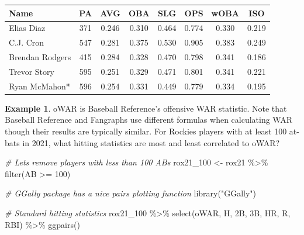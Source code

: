 \documentclass[
  11pt,
]{book}
\newenvironment{Shaded}{\begin{snugshade}}{\end{snugshade}}
\newcommand{\AttributeTok}[1]{\textcolor[rgb]{0.77,0.63,0.00}{#1}}
\newcommand{\CommentTok}[1]{\textcolor[rgb]{0.56,0.35,0.01}{\textit{#1}}}
\newcommand{\DecValTok}[1]{\textcolor[rgb]{0.00,0.00,0.81}{#1}}
\newcommand{\FunctionTok}[1]{\textcolor[rgb]{0.00,0.00,0.00}{#1}}
\newcommand{\NormalTok}[1]{#1}
\newcommand{\OtherTok}[1]{\textcolor[rgb]{0.56,0.35,0.01}{#1}}
\newcommand{\SpecialCharTok}[1]{\textcolor[rgb]{0.00,0.00,0.00}{#1}}
\newcommand{\StringTok}[1]{\textcolor[rgb]{0.31,0.60,0.02}{#1}}
\theoremstyle{definition}
\theoremstyle{definition}
\newtheorem{example}{Example}[chapter]
\theoremstyle{definition}
\theoremstyle{definition}
\theoremstyle{remark}
\begin{document}
\begin{table}[H]
\centering
\begin{tabular}{l|c|c|c|c|c|c|c}
\hline
Name & PA & AVG & OBA & SLG & OPS & wOBA & ISO\\
\hline
Elias Diaz & 371 & 0.246 & 0.310 & 0.464 & 0.774 & 0.330 & 0.219\\
\hline
C.J. Cron & 547 & 0.281 & 0.375 & 0.530 & 0.905 & 0.383 & 0.249\\
\hline
Brendan Rodgers & 415 & 0.284 & 0.328 & 0.470 & 0.798 & 0.341 & 0.186\\
\hline
Trevor Story & 595 & 0.251 & 0.329 & 0.471 & 0.801 & 0.341 & 0.221\\
\hline
Ryan McMahon* & 596 & 0.254 & 0.331 & 0.449 & 0.779 & 0.334 & 0.195\\
\hline
\end{tabular}
\end{table}

\vfill
\newpage

\begin{example}
oWAR is Baseball Reference's offensive WAR statistic. Note that Baseball Reference and Fangraphs use different formulas when calculating WAR though their results are typically similar. For Rockies players with at least 100 at-bats in 2021, what hitting statistics are most and least correlated to oWAR?
\end{example}

\begin{Shaded}
\begin{Highlighting}[]
\CommentTok{\# Let\textquotesingle{}s remove players with less than 100 ABs}
\NormalTok{rox21\_100 }\OtherTok{\textless{}{-}}\NormalTok{ rox21 }\SpecialCharTok{\%\textgreater{}\%}
    \FunctionTok{filter}\NormalTok{(AB }\SpecialCharTok{\textgreater{}=} \DecValTok{100}\NormalTok{)}

\CommentTok{\# GGally package has a nice pairs plotting function}
\FunctionTok{library}\NormalTok{(}\StringTok{"GGally"}\NormalTok{)}

\CommentTok{\# Standard hitting statistics}
\NormalTok{rox21\_100 }\SpecialCharTok{\%\textgreater{}\%}
    \FunctionTok{select}\NormalTok{(oWAR, H, }\StringTok{\textasciigrave{}}\AttributeTok{2B}\StringTok{\textasciigrave{}}\NormalTok{, }\StringTok{\textasciigrave{}}\AttributeTok{3B}\StringTok{\textasciigrave{}}\NormalTok{, HR, R, RBI) }\SpecialCharTok{\%\textgreater{}\%}
    \FunctionTok{ggpairs}\NormalTok{()}
\end{Highlighting}
\end{Shaded}
\end{document}
